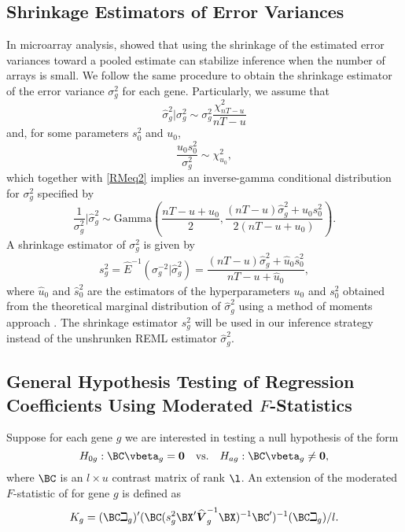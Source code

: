 \subsection{Shrinkage Estimators of Error Variances}\label{RMshrinkageSec}
In microarray analysis, \citet{smyth2004}  showed that  using  the shrinkage of the estimated error variances toward  a pooled estimate can stabilize  inference when the number of arrays is small. We follow the same procedure to obtain the shrinkage estimator of the error variance $\sigma^2_g$ for each gene. Particularly, we assume that
\begin{equation}\label{RMeq2}
\widehat{\sigma}^2_g | \sigma^2_g \sim \sigma^2_g \frac{\chi^2_{nT-u}}{nT - u}
\end{equation}
and, for some parameters $s^2_0$ and $u_0$,
\[
\frac{u_0s_0^2}{\sigma_g^2} \sim \chi^2_{u_0},
\]
which together with \eqref{RMeq2} implies an inverse-gamma conditional distribution for $\sigma^2_g$ specified by
\[
\frac{1}{\sigma^2_g} \Big| \widehat{\sigma}^2_g \sim \mbox{Gamma}\left( \frac{nT - u + u_0}{2}, \frac{(nT - u)\widehat{\sigma}^2_g + u_0 s^2_0}{2(nT - u + u_0)} \right).
\]
 A shrinkage  estimator of $\sigma^2_g$ is given by
\begin{equation}\label{RMeq3}
s^2_g = \widehat{E}^{-1}(\sigma^{-2}_g|\widehat{\sigma}^2_g)= \frac{(nT - u)\widehat{\sigma}^2_g + \widehat{u}_0 \widehat{s}^2_0}{nT - u + \widehat{u}_0},
\end{equation}
where  $\widehat{u}_0$ and  $\widehat{s}_0^2$ are the estimators of the hyperparameters $u_0$ and $s^2_0$ obtained from the theoretical marginal distribution of $\widehat{\sigma}^2_g$ using a method of moments approach \citep{smyth2004}. The shrinkage estimator $s^2_g$ will be used in our inference strategy instead of the unshrunken REML estimator $\widehat{\sigma}_g^2$.
\subsection{General Hypothesis Testing of  Regression Coefficients Using Moderated $F$-Statistics} \label{RMgeneraltest}
Suppose for each gene $g$ we are interested in testing  a null hypothesis of the form
\[
H_{0g}: \BC\vbeta_g = \boldsymbol{0} \quad \mbox{vs.}\mbox \quad H_{ag}: \BC\vbeta_g \neq \boldsymbol{0},
\]
where $\BC$ is an $l\times u$ contrast matrix of rank $\l$. An extension of the  moderated $F$-statistic of   \cite{smyth2004} for gene $g$ is defined as
\begin{equation}\label{RMeq4}
K_g = (\BC \beth_g )'(\BC (s_g^2\BX'\widehat{\boldsymbol{V}}_g^{-1}\BX )^{-1}\BC')^{-1}(\BC\beth_g) /l.
\end{equation}

